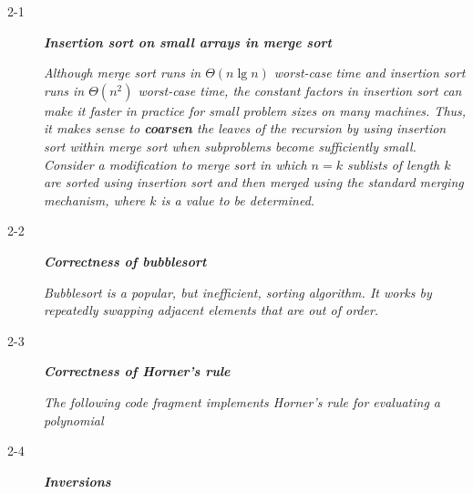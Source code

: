 \begin{description}
  \item[2-1] {\bfseries \itshape Insertion sort on small arrays in merge sort}

    {\itshape Although merge sort runs in $\Theta(n \lg n)$ worst-case time and insertion sort runs in $\Theta(n^2)$ worst-case time, the constant factors in insertion sort can make it faster in practice for small problem sizes on many machines. Thus, it makes sense to {\bfseries coarsen} the leaves of the recursion by using insertion sort within merge sort when subproblems become sufficiently small. Consider a modification to merge sort in which $n=k$ sublists of length $k$ are sorted using insertion sort and then merged using the standard merging mechanism, where $k$ is a value to be determined.
    }

    \begin{pbrev}
      
    \end{pbrev}

  \item[2-2] {\bfseries \itshape Correctness of bubblesort}

    {\itshape Bubblesort is a popular, but inefficient, sorting algorithm. It works by repeatedly
    swapping adjacent elements that are out of order.}

    \begin{pbrev}
      
    \end{pbrev}

  \item[2-3] {\bfseries \itshape Correctness of Horner’s rule}

    {\itshape The following code fragment implements Horner’s rule for evaluating a polynomial}

    \begin{pbrev}
      
    \end{pbrev}

  \item[2-4] {\bfseries \itshape Inversions}

    \begin{pbrev}
      
    \end{pbrev}

\end{description}

